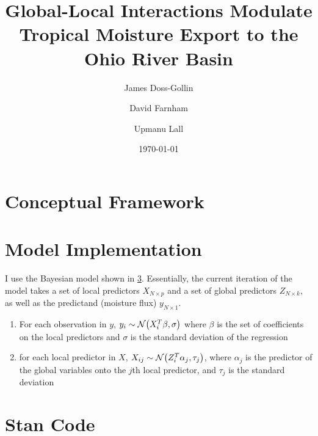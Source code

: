 \documentclass[11pt]{article}
\title{Global-Local Interactions Modulate Tropical Moisture Export to the Ohio River Basin}
\author[1,2]{James Doss-Gollin}
\author[1,2]{David Farnham}
\author[1,2]{Upmanu Lall}
\affil[1]{Columbia Water Center}
\affil[2]{Department of Earth and Environmental Engineering, Columbia University}
\date{\today}
\begin{document}
\def\ci{\perp\!\!\!\perp}
\def\ex{\mathbb{E}}
\def\prob{\mathbb{P}}
\def\ind{\mathbb{I}}
\def\grad{\triangledown}
\def\bigo{\mathcal{O}}
\def\normal{\mathcal{N}}
\def\bern{\text{Bernoulli}}
\def\logit{\text{logit}}
\def\binom{\text{Bin}}
\def\poiss{\text{Poiss}}
\def\cauchy{\text{Cauchy}}
\def\sigmoid{\vb{\sigma}}
\def\given{\big|}
\maketitle

\section{Conceptual Framework}




\section{Model Implementation}

I use the Bayesian model shown in \cref{sec:stan}.
Essentially, the current iteration of the model takes a set of local predictors $X_{N \times p}$ and a set of global predictors $Z_{N \times k}$, as well as the predictand (moisture flux) $y_{N \times 1}$.
\begin{enumerate}
    \item For each observation in $y$, $y_i \sim \normal \qty(X_i^T \beta, \sigma)$ where $\beta$ is the set of coefficients on the local predictors and $\sigma$ is the standard deviation of the regression
    \item for each local predictor in $X$, $X_{ij} \sim \normal \qty(Z_i^T \alpha_j, \tau_j)$, where $\alpha_j$ is the predictor of the global variables onto the $j$th local predictor, and $\tau_j$ is the standard deviation
\end{enumerate}



\clearpage


\appendix
\section{Stan Code} \label{sec:stan}

\end{document}
